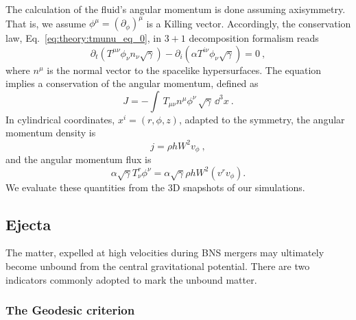 The calculation of the fluid's angular momentum is done assuming axisymmetry.
That is, we assume $\phi^{\mu} = (\partial_{\phi})^{\mu}$ is a Killing
vector. 
Accordingly, the conservation law, Eq.~\eqref{eq:theory:tmunu_eq_0}, 
in $3+1$ decomposition formalism reads
%
\begin{equation}
\partial_t(T^{\mu\nu}\phi_{\nu}n_{\nu}\sqrt{\gamma}) -
\partial_i(\alpha T^{i \nu}\phi_{\nu}\sqrt{\gamma}) = 0 \ ,
\end{equation}
%
where $n^\mu$ is the normal vector to the spacelike hypersurfaces.
%
The equation implies a conservation of the angular momentum, 
defined as 
\begin{equation}
J = %
-\int \,
T_{\mu\nu}n^{\mu}\phi^{\nu}\,\sqrt{\gamma}\, \dd^3 x\ .
\end{equation}
%
In cylindrical coordinates, $x^i=(r,\phi,z)$, adapted to the symmetry, 
the angular momentum density is  
%
\begin{equation}
j = %
\rho h W^2 v_{\phi} \ ,
\label{eq:method:ang_mom}
\end{equation}
%
and the angular momentum flux is 
%
\begin{equation}
\alpha\sqrt{\gamma}T^r _{\nu}\phi^{\nu} =
\alpha\sqrt{\gamma}\rho h W^2 (v^{r}v_{\phi}) .
\end{equation}
%
We evaluate these quantities from the $3$D snapshots of our simulations.




\subsection{Ejecta} \label{sec:bns_sims:method:ejecta}

The matter, expelled at high velocities during \ac{BNS} mergers 
may ultimately become unbound from the 
central gravitational potential. 
There are two indicators commonly adopted to mark the unbound matter.

\subsubsection{The Geodesic criterion}

